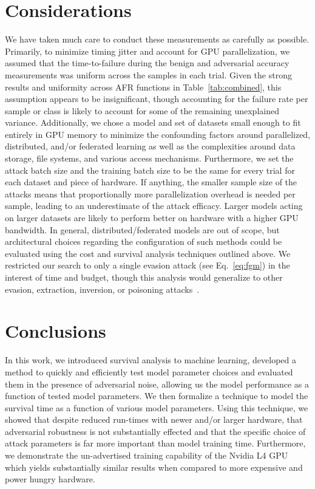 \documentclass[conference]{IEEEtran}
\begin{document}
\section{Considerations}
\label{considerations}
We have taken much care to conduct these measurements as carefully as possible.
Primarily, to minimize timing jitter and account for GPU parallelization, we assumed that the time-to-failure during the benign and adversarial accuracy measurements was uniform across the samples in each trial. 
Given the strong results and uniformity across AFR functions in Table~\ref{tab:combined}, this assumption appears to be insignificant, though accounting for the failure rate per sample or class is likely to account for some of the remaining unexplained variance. Additionally, we chose a model and set of datasets small enough to fit entirely in GPU memory to minimize the confounding factors around parallelized, distributed, and/or federated learning as well as the complexities around data storage, file systems, and various access mechanisms. 
Furthermore, we set the attack batch size and the training batch size to be the same for every trial for each dataset and piece of hardware.
If anything, the smaller sample size of the attacks means that proportionally more parallelization overhead is needed per sample, leading to an underestimate of the attack efficacy.
Larger models acting on larger datasets are likely to perform better on hardware with a higher GPU bandwidth. 
In general, distributed/federated models are out of scope, but architectural choices regarding the configuration of such methods could be evaluated using the cost and survival analysis techniques outlined above. 
We restricted our search to only a single evasion attack (see Eq.~\ref{eq:fgm}) in the interest of time and budget, though this analysis would generalize to other evasion, extraction, inversion, or poisoning attacks~\cite{biggio_evasion_2013,biggio_poisoning_2013,choquette2021label,orekondy2019knockoff}.

\section{Conclusions}
\label{conclusion}
In this work, we introduced survival analysis to machine learning, developed a method to quickly and efficiently test model parameter choices and evaluated them in the presence of adversarial noise, allowing us the model performance as a function of tested model parameters. We then formalize a technique to model the survival time as a function of various model parameters. 
Using this technique, we showed that despite reduced run-times with newer and/or larger hardware, that adversarial robustness is not substantially effected and that the specific choice of attack parameters is far more important than model training time. 
Furthermore, we demonstrate the un-advertised training capability of the Nvidia L4 GPU which yields substantially similar results when compared to more expensive and power hungry hardware. 
\end{document}

